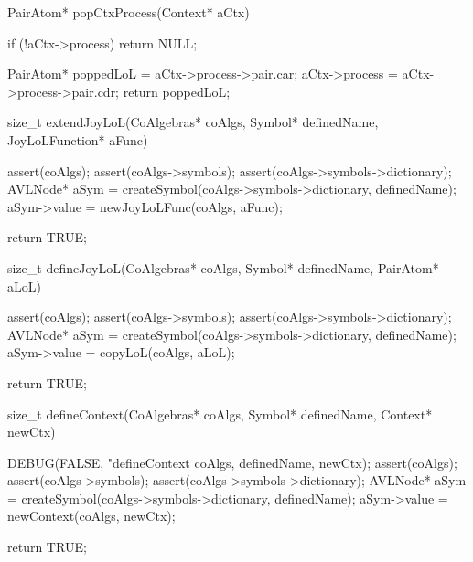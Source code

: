 PairAtom* popCtxProcess(Context* aCtx) {
  if (!aCtx->process) return NULL;

  PairAtom* poppedLoL = aCtx->process->pair.car;
  aCtx->process       = aCtx->process->pair.cdr;
  return poppedLoL;
}

size_t extendJoyLoL(CoAlgebras* coAlgs,
                    Symbol* definedName,
                    JoyLoLFunction* aFunc) {
  assert(coAlgs);
  assert(coAlgs->symbols);
  assert(coAlgs->symbols->dictionary);
  AVLNode* aSym =
    createSymbol(coAlgs->symbols->dictionary, definedName);
  aSym->value = newJoyLoLFunc(coAlgs, aFunc);

  return TRUE;
}

size_t defineJoyLoL(CoAlgebras* coAlgs,
                    Symbol* definedName,
                    PairAtom* aLoL) {
  assert(coAlgs);
  assert(coAlgs->symbols);
  assert(coAlgs->symbols->dictionary);
  AVLNode* aSym =
    createSymbol(coAlgs->symbols->dictionary, definedName);
  aSym->value = copyLoL(coAlgs, aLoL);

  return TRUE;
}

size_t defineContext(CoAlgebras* coAlgs,
                     Symbol* definedName,
                     Context* newCtx) {
  DEBUG(FALSE, "defineContext %
        coAlgs, definedName, newCtx);
  assert(coAlgs);
  assert(coAlgs->symbols);
  assert(coAlgs->symbols->dictionary);
  AVLNode* aSym =
    createSymbol(coAlgs->symbols->dictionary, definedName);
  aSym->value   = newContext(coAlgs, newCtx);

  return TRUE;
}